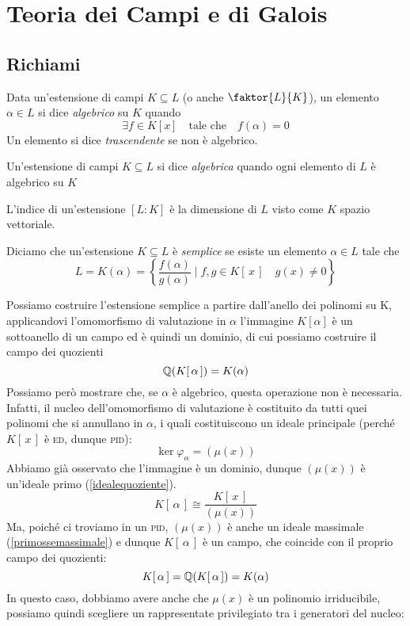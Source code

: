 \setcounter{section}{10} %
\section{Teoria dei Campi e di Galois}

\subsection{Richiami}
\begin{multicols}{2}

\begin{definition}
	Data un'estensione di campi $ K \subseteq L $ (o anche $ \faktor{L}{K} $), un elemento $ \alpha \in L $ si dice \emph{algebrico} su $ K $ quando 
	\[ \exists f \in K[x] \quad \text{tale che} \quad f(\alpha) = 0 \]
	Un elemento si dice \emph{trascendente} se non è algebrico.
\end{definition}

\begin{definition}
	Un'estensione di campi $ K \subseteq L $ si dice \emph{algebrica} quando ogni elemento di $ L $ è algebrico su $ K $
\end{definition}

\begin{definition}
	L'indice di un'estensione $ [L:K] $ è la dimensione di $ L $ visto come $ K $ spazio vettoriale.
\end{definition}

\begin{definition}
	Diciamo che un'estensione $ K \subseteq L $ è \emph{semplice} se esiste un elemento $ \alpha \in L $ tale che
	\[ L = K(\alpha) = \left\{ \frac{f(\alpha)}{g(\alpha)} \mid f, g \in K[\,x\,] \quad g(x) \neq 0  \right\} \]
\end{definition}

Possiamo costruire l'estensione semplice a partire dall'anello dei polinomi su K, applicandovi l'omomorfismo di valutazione in $ \alpha $
l'immagine $ K[\alpha] $ è un sottoanello di un campo ed è quindi un dominio, di cui possiamo costruire il campo dei quozienti
\[ \mathbb{Q}(K[\,\alpha\,]) = K(\alpha) \]
Possiamo però mostrare che, se $ \alpha $ è algebrico, questa operazione non è necessaria. Infatti, il nucleo dell'omomorfismo di valutazione è costituito da tutti quei polinomi che si annullano in $ \alpha $, i quali costituiscono un ideale principale (perché $ K[\,x\,] $ è \textsc{ed}, dunque \textsc{pid}):
\[ \ker\varphi_\alpha = (\mu(x)) \]
Abbiamo già osservato che  l'immagine è un dominio, dunque $ (\mu(x)) $ è un'ideale primo (\ref{idealequoziente}).
\[ K[\,\alpha\,] \cong \frac{K[\,x\,]}{(\mu(x))} \]
Ma, poiché ci troviamo in un \textsc{pid}, $ (\mu(x)) $ è anche un ideale massimale (\ref{primossemassimale}) e dunque $ K[\,\alpha\,] $ è un campo, che coincide con il proprio campo dei quozienti:
\[ K[\,\alpha\,] = \mathbb{Q}(K[\,\alpha\,]) = K(\alpha) \]
In questo caso, dobbiamo avere anche che $ \mu(x) $ è un polinomio irriducibile, possiamo quindi scegliere un rappresentate privilegiato tra i generatori del nucleo:


\end{multicols}
